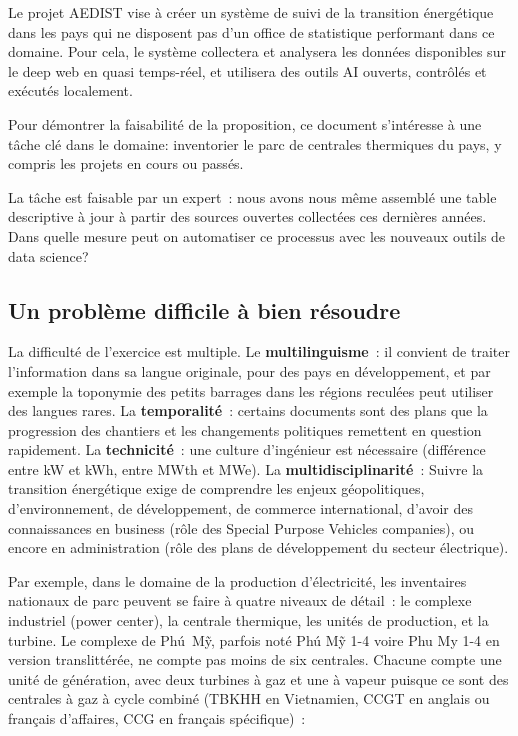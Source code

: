 \documentclass[a4paper,11pt]{report}
\begin{document}
Le projet AEDIST vise à créer un système de suivi de la transition énergétique dans les pays qui ne disposent pas d'un office de statistique performant dans ce domaine. Pour cela, le système collectera et analysera les données disponibles sur le deep web en quasi temps-réel, et utilisera des outils AI ouverts, contrôlés et exécutés localement.

Pour démontrer la faisabilité de la proposition, ce document s'intéresse à une tâche clé dans le domaine: inventorier le parc de centrales thermiques du pays, y compris les projets en cours ou passés.

La tâche est faisable par un expert~: nous avons nous même assemblé une table descriptive à jour à partir des sources ouvertes collectées ces dernières années. Dans quelle mesure peut on automatiser ce processus avec les nouveaux outils de data science?

\subsection{Un problème difficile à bien résoudre}\label{un-probluxe8me-difficile-uxe0-bien-ruxe9soudre}

La difficulté de l'exercice est multiple. Le \textbf{multilinguisme}~: il convient de traiter l'information dans sa langue originale, pour des pays en développement, et par exemple la toponymie des petits barrages dans les régions reculées peut utiliser des langues rares. La \textbf{temporalité}~: certains documents sont des plans que la progression des chantiers et les changements politiques remettent en question rapidement. La \textbf{technicité}~: une culture d'ingénieur est nécessaire (différence entre kW et kWh, entre MWth et MWe). La \textbf{multidisciplinarité}~: Suivre la transition énergétique exige de comprendre les enjeux géopolitiques, d'environnement, de développement, de commerce international, d'avoir des connaissances en business (rôle des Special Purpose Vehicles companies), ou encore en administration (rôle des plans de développement du secteur électrique).

Par exemple, dans le domaine de la production d'électricité, les inventaires nationaux de parc peuvent se faire à quatre niveaux de détail~: le complexe industriel (power center), la centrale thermique, les unités de production, et la turbine. Le complexe de Phú~Mỹ, parfois noté Phú Mỹ 1-4 voire Phu My 1-4 en version translittérée, ne compte pas moins de six centrales. Chacune compte une unité de génération, avec deux turbines à gaz et une à vapeur puisque ce sont des centrales à gaz à cycle combiné (TBKHH en Vietnamien, CCGT en anglais ou français d'affaires, CCG en français spécifique)~:
\end{document}

